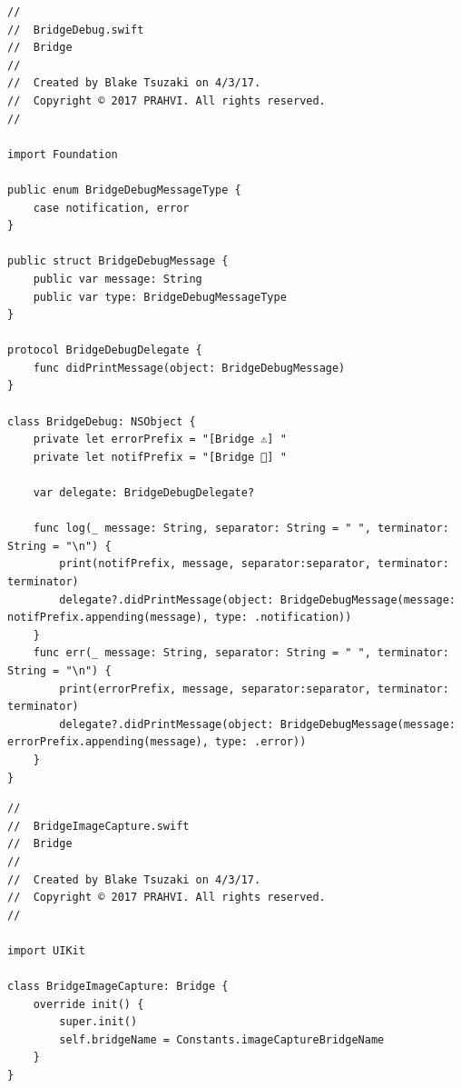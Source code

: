 \begin{lstlisting}
//
//  BridgeDebug.swift
//  Bridge
//
//  Created by Blake Tsuzaki on 4/3/17.
//  Copyright © 2017 PRAHVI. All rights reserved.
//

import Foundation

public enum BridgeDebugMessageType {
    case notification, error
}

public struct BridgeDebugMessage {
    public var message: String
    public var type: BridgeDebugMessageType
}

protocol BridgeDebugDelegate {
    func didPrintMessage(object: BridgeDebugMessage)
}

class BridgeDebug: NSObject {
    private let errorPrefix = "[Bridge ⚠️] "
    private let notifPrefix = "[Bridge 💬] "
    
    var delegate: BridgeDebugDelegate?
    
    func log(_ message: String, separator: String = " ", terminator: String = "\n") {
        print(notifPrefix, message, separator:separator, terminator: terminator)
        delegate?.didPrintMessage(object: BridgeDebugMessage(message: notifPrefix.appending(message), type: .notification))
    }
    func err(_ message: String, separator: String = " ", terminator: String = "\n") {
        print(errorPrefix, message, separator:separator, terminator: terminator)
        delegate?.didPrintMessage(object: BridgeDebugMessage(message: errorPrefix.appending(message), type: .error))
    }
}
\end{lstlisting}

\begin{lstlisting}
//
//  BridgeImageCapture.swift
//  Bridge
//
//  Created by Blake Tsuzaki on 4/3/17.
//  Copyright © 2017 PRAHVI. All rights reserved.
//

import UIKit

class BridgeImageCapture: Bridge {
    override init() {
        super.init()
        self.bridgeName = Constants.imageCaptureBridgeName
    }
}
\end{lstlisting}

